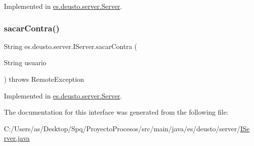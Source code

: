 Implemented in \mbox{\hyperlink{classes_1_1deusto_1_1server_1_1_server_a0f79b8db6904facdae94410e26bef452}{es.\+deusto.\+server.\+Server}}.

\mbox{\label{interfacees_1_1deusto_1_1server_1_1_i_server_a950b819a4f67edf0ef76221dd4714d47}} 
\subsubsection{\texorpdfstring{sacarContra()}{sacarContra()}}
{\footnotesize\ttfamily String es.\+deusto.\+server.\+I\+Server.\+sacar\+Contra (\begin{DoxyParamCaption}\item[{String}]{usuario }\end{DoxyParamCaption}) throws Remote\+Exception}



Implemented in \mbox{\hyperlink{classes_1_1deusto_1_1server_1_1_server_aefe051d880626950ea2964d89a4ae3c3}{es.\+deusto.\+server.\+Server}}.



The documentation for this interface was generated from the following file\+:\begin{DoxyCompactItemize}
\item 
C\+:/\+Users/as/\+Desktop/\+Spq/\+Proyecto\+Procesos/src/main/java/es/deusto/server/\mbox{\hyperlink{_i_server_8java}{I\+Server.\+java}}\end{DoxyCompactItemize}
